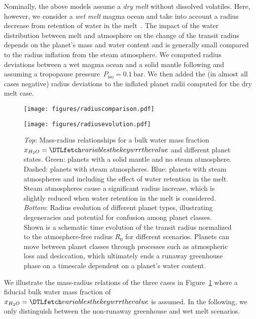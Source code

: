 \documentclass[twocolumn,twocolappendix]{aastex631}
\begin{document}
Nominally, the above models assume a \textit{dry melt} without dissolved volatiles.
Here, however, we consider a \textit{wet melt} magma ocean and take into account a radius decrease from retention of water in the melt~\citep{Dorn2021}.
The impact of the water distribution between melt and atmosphere on the change of the transit radius depends on the planet's mass and water content and is generally small compared to the radius inflation from the steam atmosphere.
We computed radius deviations between a wet magma ocean and a solid mantle following \citet{Dorn2021} and assuming a tropopause pressure~$P_\mathrm{iso}=\SI{0.1}{\bar}$.
We then added the (in almost all cases negative) radius deviations to the inflated planet radii computed for the dry melt case.

\begin{figure}
    \begin{centering}
        \texttt{[image: figures/radiuscomparison.pdf]}
    \end{centering}
    \begin{centering}
        \texttt{[image: figures/radiusevolution.pdf]}
        \caption{
            \textit{Top}: Mass-radius relationships for a bulk water mass fraction $x_{H_2O}= \var{wrr}$ and different planet states. Green: planets with a solid mantle and no steam atmosphere. Dashed: planets with steam atmospheres. Blue: planets with steam atmospheres and including the effect of water retention in the melt.
                Steam atmospheres cause a significant radius increase, which is slightly reduced when water retention in the melt is considered.
            \textit{Bottom}: Radius evolution of different planet types, illustrating degeneracies and potential for confusion among planet classes. Shown is a schematic time evolution of the transit radius normalized to the atmosphere-free radius $R_\mathrm{0}$ for different scenarios. Planets can move between planet classes through processes such as atmospheric loss and desiccation, which ultimately ends a runaway greenhouse phase on a timescale dependent on a planet's water content.}
        \label{fig:radiusevolution}
    \end{centering}
\end{figure}
We illustrate the mass-radius relations of the three cases in Figure~\ref{fig:radiusevolution} where a fiducial bulk water mass fraction of $x_{H_2O}= \var{wrr}$ is assumed. %
In the following, we only distinguish between the non-runaway greenhouse and wet melt scenarios.
\end{document}
